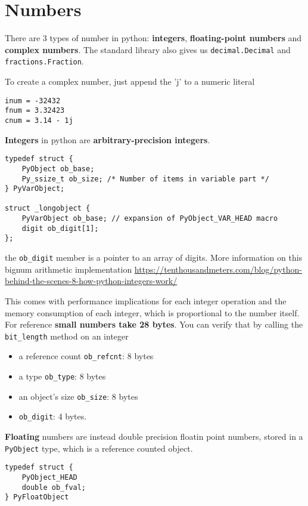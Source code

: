 \documentclass[10pt, openany]{article}
\begin{document}
  \section{Numbers}
  There are 3 types of number in python: \textbf{integers}, 
  \textbf{floating-point numbers} and \textbf{complex numbers}. The 
  standard library also gives us \texttt{decimal.Decimal} and 
  \texttt{fractions.Fraction}.\par
  To create a complex number, just append the 'j' to a numeric literal
  \par
  \begin{lstlisting}
inum = -32432
fnum = 3.32423
cnum = 3.14 - 1j
  \end{lstlisting}
\textbf{Integers} in python are \textbf{arbitrary-precision integers}.
  \begin{lstlisting}
typedef struct {
    PyObject ob_base;
    Py_ssize_t ob_size; /* Number of items in variable part */
} PyVarObject;

struct _longobject {
    PyVarObject ob_base; // expansion of PyObject_VAR_HEAD macro
    digit ob_digit[1];
};
  \end{lstlisting}
  the \texttt{ob\_digit} member is a pointer to an array of digits.
  More information on this bignum arithmetic implementation 
  \url{https://tenthousandmeters.com/blog/python-behind-the-scenes-8-how-python-integers-work/}\par
  This comes with performance implications for each integer 
  operation and the memory consumption of each integer, which is 
  proportional to the number itself. For reference \textbf{small 
  numbers take 28 bytes}. You can verify that by calling the 
  \texttt{bit\_length} method on an integer
  \begin{itemize}[noitemsep, topsep=0pt]
    \item a reference count \texttt{ob\_refcnt}: 8 bytes
    \item a type \texttt{ob\_type}: 8 bytes
    \item an object's size \texttt{ob\_size}: 8 bytes
    \item \texttt{ob\_digit}: 4 bytes.
  \end{itemize}
  \textbf{Floating} numbers are instead double precision floatin point
  numbers, stored in a \texttt{PyObject} type, which is a reference
  counted object.
  \begin{lstlisting}
typedef struct { 
    PyObject_HEAD
    double ob_fval; 
} PyFloatObject
  \end{lstlisting}
\end{document}
